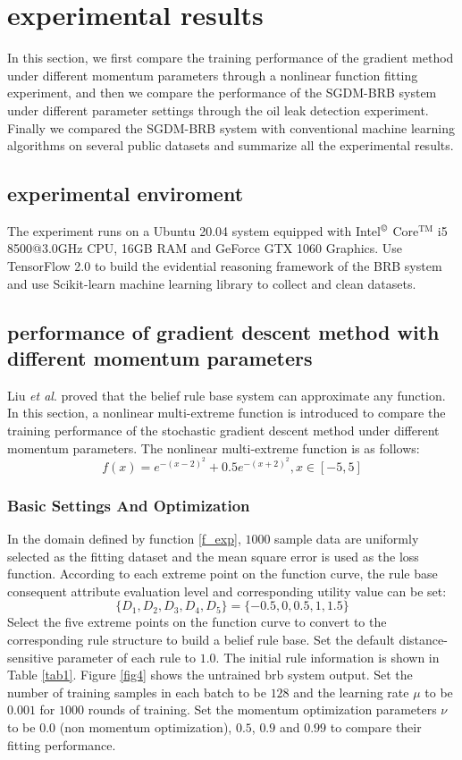 \documentclass{ieeeaccess}
\begin{document}
\section{experimental results}
In this section, we first compare the training performance of the gradient method under different momentum parameters through a nonlinear function fitting experiment,
and then we compare the performance of the SGDM-BRB system under different parameter settings through the oil leak detection experiment.
Finally we compared the SGDM-BRB system with conventional machine learning algorithms on several public datasets and summarize all the experimental results.

\subsection{experimental enviroment}
The experiment runs on a Ubuntu 20.04 system equipped with Intel$^{\copyright}$ Core$^{\text{TM}}$ i5 8500@3.0GHz CPU, 16GB RAM and GeForce GTX 1060 Graphics.
Use TensorFlow 2.0 to build the evidential reasoning framework of the BRB system and use Scikit-learn machine learning library to collect and clean datasets.

\subsection{performance of gradient descent method with different momentum parameters}
Liu \textit{et al}.\cite{a16} proved that the belief rule base system can approximate any function.
In this section, a nonlinear multi-extreme function is introduced to compare the training performance of the stochastic gradient descent method under different momentum parameters.
The nonlinear multi-extreme function is as follows:
\begin{equation}
    f(x)=e^{-(x-2)^2}+0.5e^{-(x+2)^2},x\in[-5,5]
    \label{f_exp}
\end{equation}

\subsubsection{Basic Settings And Optimization}
In the domain defined by function \eqref{f_exp}, $1000$ sample data are uniformly selected as the fitting dataset and the mean square error is used as the loss function.
According to each extreme point on the function curve, the rule base consequent attribute evaluation level and corresponding utility value can be set:
$$\{D_1,D_2,D_3,D_4,D_5\}=\{-0.5,0,0.5,1,1.5\}$$
Select the five extreme points on the function curve to convert to the corresponding rule structure to build a belief rule base.
Set the default distance-sensitive parameter of each rule to $1.0$.
The initial rule information is shown in Table \ref{tab1}. Figure \ref{fig4} shows the untrained brb system output.
Set the number of training samples in each batch to be $128$ and the learning rate $\mu$ to be $0.001$ for $1000$ rounds of training.
Set the momentum optimization parameters $\nu$ to be 0.0 (non momentum optimization), $0.5$, $0.9$ and $0.99$ to compare their fitting performance.
\end{document}
